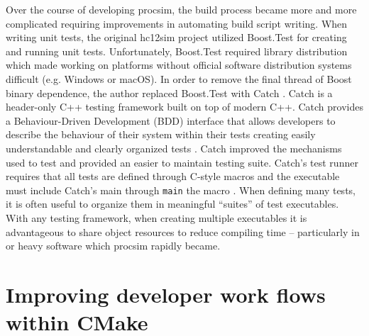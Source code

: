 Over the course of developing procsim, the build process became more and more complicated requiring improvements in automating build script writing. When writing unit tests, the original hc12sim project utilized Boost.Test \cite{Boost1.53.0:Test} for creating and running unit tests. Unfortunately, Boost.Test required library distribution which made working on platforms without official software distribution systems difficult (e.g. Windows or macOS). In order to remove the final thread of Boost binary dependence, the author replaced Boost.Test with Catch \cite{CatchLib}. Catch is a header-only C++ testing framework built on top of modern C++. Catch provides a Behaviour-Driven Development (BDD) interface that allows developers to describe the behaviour of their system within their tests creating easily understandable and clearly organized tests \cite{Solis2011}. Catch improved the mechanisms used to test and provided an easier to maintain testing suite. Catch's test runner requires that all tests are defined through C-style macros and the executable must include Catch's main through \verb|main| the  macro \cite{CatchLib:Tutorial}. When defining many tests, it is often useful to organize them in meaningful ``suites'' of test executables. With any testing framework, when creating multiple executables it is advantageous to share object resources to reduce compiling time -- particularly in  or  heavy software which procsim rapidly became.

\section{Improving developer work flows within CMake}
\label{sec:cross-platform:sec:cmake-flows}

